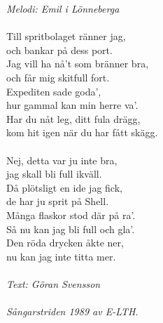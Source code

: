 {\footnotesize\textit{Melodi: Emil i Lönneberga}}\\
\\
Till spritbolaget ränner jag,\\
och bankar på dess port.\\
Jag vill ha nå't som bränner bra,\\
och får mig skitfull fort.\\
Expediten sade goda',\\
hur gammal kan min herre va'.\\
Har du nåt leg, ditt fula drägg,\\
kom hit igen när du har fått skägg.\\
\\
Nej, detta var ju inte bra,\\
jag skall bli full ikväll.\\
Då plötsligt en ide jag fick,\\
de har ju sprit på Shell.\\
Många flaskor stod där på ra'.\\
Så nu kan jag bli full och gla'.\\
Den röda drycken åkte ner,\\
nu kan jag inte titta mer.\\
\\
{\footnotesize\textit{Text: Göran Svensson \\ \\ Sångarstriden 1989 av
    E-LTH.}}
